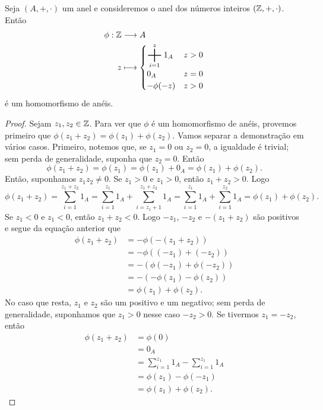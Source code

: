 \begin{ex}
	Seja $(A,+,\cdot)$ um anel e consideremos o anel dos números inteiros $(\mathbb{Z},+,\cdot)$. Então
	\begin{align*}
	\func{\phi}{\Z}{A}{z}{\begin{cases}
					\displaystyle \sum_{i=1}^z 1_A & z>0 \\
					0_A & z=0 \\
					-\phi(-z) & z>0
					\end{cases}}
	\end{align*}
é um homomorfismo de anéis.
\end{ex}
\begin{proof}
	Sejam $z_1,z_2 \in \mathbb{Z}$. Para ver que $\phi$ é um homomorfismo de anéis, provemos primeiro que $\phi(z_1+z_2)=\phi(z_1)+\phi(z_2)$. Vamos separar a demonstração em vários casos. Primeiro, notemos que, se $z_1=0$ ou $z_2=0$, a igualdade é trivial; sem perda de generalidade, suponha que $z_2=0$. Então
	\begin{equation*}
	\phi(z_1+z_2) = \phi(z_1) = \phi(z_1) + 0_A = \phi(z_1) + \phi(z_2).
	\end{equation*}
Então, suponhamos $z_1z_2 \neq 0$. Se $z_1>0$ e $z_1>0$, então $z_1+z_2>0$. Logo
	\begin{equation*}
	\phi(z_1+z_2) = \sum_{i=1}^{z_1+z_2} 1_A = \sum_{i=1}^{z_1} 1_A + \sum_{i=z_1+1}^{z_1+z_2} 1_A = \sum_{i=1}^{z_1} 1_A + \sum_{i=1}^{z_2} 1_A = \phi(z_1)+\phi(z_2).
	\end{equation*}
Se $z_1<0$ e $z_1<0$, então $z_1+z_2<0$. Logo $-z_1$, $-z_2$ e $-(z_1+z_2)$ são positivos e segue da equação anterior que
	\begin{align*}
	\phi(z_1+z_2) &= -\phi(-(z_1+z_2)) \\
		&= -\phi((-z_1)+(-z_2)) \\
		&= -(\phi(-z_1)+\phi(-z_2)) \\
		&= -(-\phi(z_1)-\phi(z_2)) \\
		&= \phi(z_1)+\phi(z_2).
	\end{align*}
No caso que resta, $z_1$ e $z_2$ são um positivo e um negativo; sem perda de generalidade, suponhamos que $z_1>0$ nesse caso $-z_2>0$. Se tivermos $z_1=-z_2$, então
	\begin{align*}
	\phi(z_1+z_2) &= \phi(0) \\
		&= 0_A \\
		&= \sum_{i=1}^{z_1} 1_A - \sum_{i=1}^{z_1} 1_A \\
		&= \phi(z_1)-\phi(-z_1) \\
		&= \phi(z_1)+\phi(z_2).

\end{align*}
\end{proof}
